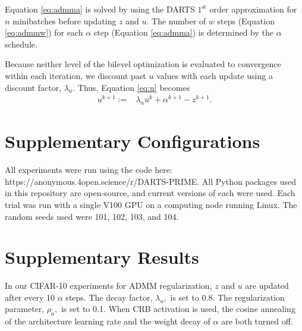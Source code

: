 \documentclass[letterpaper]{article} \usepackage{aaai22}  \usepackage{times}  \usepackage{helvet}  \usepackage{courier}  \usepackage[hyphens]{url}  \usepackage{graphicx} \urlstyle{rm} \def\UrlFont{\rm}  \usepackage{natbib}  \usepackage{caption} \DeclareCaptionStyle{ruled}{labelfont=normalfont,labelsep=colon,strut=off} \frenchspacing  \setlength{\pdfpagewidth}{8.5in}  \setlength{\pdfpageheight}{11in}  \usepackage{algorithm}
\begin{document}
Equation \ref{eq:admma} is solved by using the DARTS $1^\text{st}$ order approximation for $n$ minibatches before updating $z$ and $u$. The number of $w$ steps (Equation \ref{eq:admmw}) for each $\alpha$ step (Equation \ref{eq:admma}) is determined by the $\alpha$ schedule.

Because neither level of the bilevel optimization is evaluated to convergence within each iteration, we discount past $u$ values with each update using a discount factor, $\lambda_u$. Thus, Equation \ref{eq:u} becomes
\begin{align}
    u^{k+1} := &\lambda_u u^k+\alpha^{k+1} - z^{k+1}.
\end{align}

\section{Supplementary Configurations} \label{sec:suppconfig}

All experiments were run using the code here: https://anonymous.4open.science/r/DARTS-PRIME. All Python packages used in this repository are open-source, and current versions of each were used. Each trial was run with a single V100 GPU on a computing node running Linux. The random seeds used were 101, 102, 103, and 104.

\section{Supplementary Results} \label{sec:suppresults}
In our CIFAR-10 experiments for ADMM regularization, $z$ and $u$ are updated after every 10 $\alpha$ steps. The decay factor, $\lambda_u,$ is set to $0.8$. The regularization parameter, $\rho_{a},$ is set to 0.1. When CRB activation is used, the cosine annealing of the architecture learning rate and the weight decay of $\alpha$ are both turned off.
\end{document}

